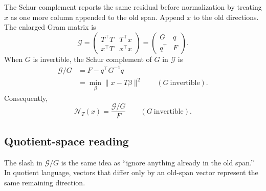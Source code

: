 \documentclass[10pt,twocolumn]{article}
\newcommand{\nov}{\mathcal N}
\begin{document}
The Schur complement reports the same residual before normalization by treating $x$ as one more column appended to the old span. Append $x$ to the old directions. The enlarged Gram matrix is
\begin{equation}
\mathcal G
=\begin{pmatrix}
T^\top T&T^\top x\\
x^\top T&x^\top x
\end{pmatrix}
=\begin{pmatrix}
G&q\\
q^\top&F
\end{pmatrix}.
\label{eq:block_gram}
\end{equation}
When $G$ is invertible, the Schur complement of $G$ in $\mathcal G$ is
\begin{equation}
\boxed{
\begin{aligned}
\mathcal G/G
&=F-q^\top G^{-1}q\\
&=\min_\beta\|x-T\beta\|^2
\qquad(G\ \text{invertible}).
\end{aligned}
}
\label{eq:gram_schur}
\end{equation}
Consequently,
\begin{equation}
\nov_T(x)
=\frac{\mathcal G/G}{F}
\qquad(G\ \text{invertible}).
\label{eq:schur_to_novelty}
\end{equation}

\subsection{Quotient-space reading}

\begin{intuitionbox}
The slash in \(\mathcal G/G\) is the same idea as ``ignore anything already in the old span.'' In quotient language, vectors that differ only by an old-span vector represent the same remaining direction.
\end{intuitionbox}
\end{document}
